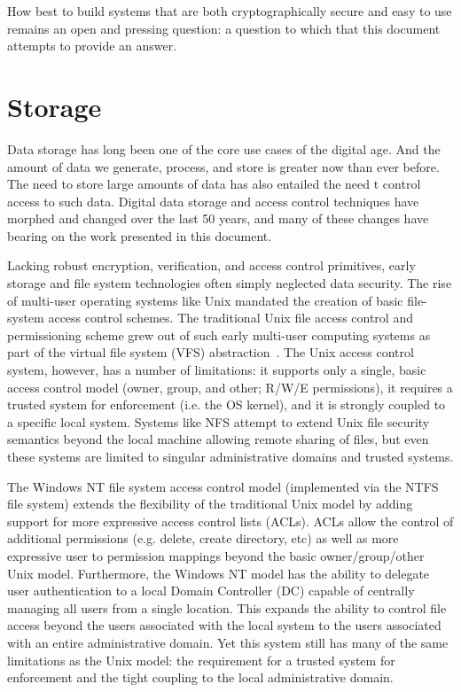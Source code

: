 How best to build systems that are both cryptographically secure and
easy to use remains an open and pressing question: a question to which
that this document attempts to provide an answer.

\section{Storage}
\label{chap:background:storage}

Data storage has long been one of the core use cases of the digital
age. And the amount of data we generate, process, and store is greater
now than ever before. The need to store large amounts of data has also
entailed the need t control access to such data. Digital data storage
and access control techniques have morphed and changed over the last
50 years, and many of these changes have bearing on the work presented
in this document.

Lacking robust encryption, verification, and access control
primitives, early storage and file system technologies often simply
neglected data security. The rise of multi-user operating systems like
Unix mandated the creation of basic file-system access control
schemes. The traditional Unix file access control and permissioning
scheme grew out of such early multi-user computing systems as part of
the virtual file system (VFS) abstraction~\cite{linux-vfs}. The Unix
access control system, however, has a number of limitations: it
supports only a single, basic access control model (owner, group, and
other; R/W/E permissions), it requires a trusted system for
enforcement (i.e. the OS kernel), and it is strongly coupled to a
specific local system. Systems like NFS attempt to extend Unix file
security semantics beyond the local machine allowing remote sharing of
files, but even these systems are limited to singular administrative
domains and trusted systems.

The Windows NT file system access control model (implemented via the
NTFS file system) extends the flexibility of the traditional Unix
model by adding support for more expressive access control lists
(ACLs). ACLs allow the control of additional permissions (e.g. delete,
create directory, etc) as well as more expressive user to permission
mappings beyond the basic owner/group/other Unix model. Furthermore,
the Windows NT model has the ability to delegate user authentication
to a local Domain Controller (DC) capable of centrally managing all
users from a single location. This expands the ability to control file
access beyond the users associated with the local system to the users
associated with an entire administrative domain. Yet this system still
has many of the same limitations as the Unix model: the requirement
for a trusted system for enforcement and the tight coupling to the
local administrative domain.

